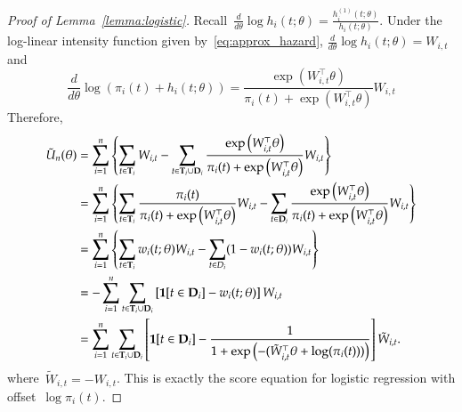 \documentclass[11pt]{amsart}
\def\bfT{{\bf T}}
\def\bfD{{\bf D}}
\begin{document}
\begin{proof}[Proof of Lemma~\ref{lemma:logistic}]
Recall~$\frac{d}{d\theta} \log h_i (t; \theta) = \frac{h^{(1)}_i (t; \theta)}{h_i (t; \theta)}$. Under the log-linear intensity function given by~\eqref{eq:approx_hazard}, $\frac{d}{d\theta} \log h_i (t; \theta) = W_{i,t}$ and
\[
\frac{d}{d \theta} \log \left( \pi_i (t) + h_i (t;\theta) \right) =
\frac{\exp \left( W_{i,t}^\top \theta \right)}{\pi_i (t) + \exp
  \left( W_{i,t}^\top \theta \right)} W_{i,t}
\]
Therefore,
\begin{align*}
\tilde U_n (\theta)
  &= \sum_{i=1}^n \left \{ \sum_{t \in \bfT_i} W_{i,t} - \sum_{t \in \bfT_i \cup \bfD_i} \frac{\exp \left( W_{i,t}^\top \theta \right)}{\pi_i (t) + \exp \left( W_{i,t}^\top \theta \right)}  W_{i,t} \right \} \\
  &= \sum_{i=1}^n \left \{ \sum_{t \in \bfT_i} \frac{\pi_i (t)}{\pi_i (t) + \exp \left( W_{i,t}^\top \theta \right)} W_{i,t} - \sum_{t \in \bfD_i} \frac{\exp \left( W_{i,t}^\top \theta \right)}{\pi_i (t) + \exp \left( W_{i,t}^\top \theta \right)} W_{i,t} \right \} \\
  &= \sum_{i=1}^n \left \{ \sum_{t \in \bfT_i} w_{i} (t; \theta) W_{i,t} -
    \sum_{t \in D_i} (1 - w_i (t; \theta)) W_{i,t} \right \} \\
  &= - \sum_{i=1}^n \sum_{t \in \bfT_i \cup \bfD_i} \left[ {\bf 1} [t \in \bfD_i]  - w_{i} (t; \theta) \right] W_{i,t} \\
  &= \sum_{i=1}^n \sum_{t \in \bfT_i \cup \bfD_i}
    \left[ {\bf 1} [t \in \bfD_i]  - \frac{1}{1 + \exp\left( - (
          \tilde W_{i,t}^\top \theta + \log (\pi_i (t) ) ) \right)}
    \right] \tilde W_{i,t}.
\end{align*}
where~$\tilde W_{i,t} = - W_{i,t}$. This is exactly the score equation
for logistic regression with offset~$\log \pi_i (t)$.
\end{proof}
\end{document}
